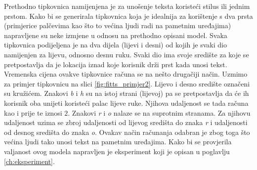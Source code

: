 \documentclass[times, utf8, zavrsni, numeric]{fer}
\begin{document}
Prethodno tipkovnica namijenjena je za unošenje teksta koristeći stilus ili jednim prstom. Kako bi se generirala tipkovnica koja je idealnija za korištenje s dva prsta (primjerice palčevima kao što to većina ljudi radi na pametnim uređajima) napravljene su neke izmjene u odnosu na prethodno opisani model. Svaka tipkovnica podijeljena je na dva dijela (lijevi i desni) od kojih je svaki dio namijenjen za lijevu, odnosno desnu ruku. Svaki dio ima svoje središte za koje se pretpostavlja da je lokacija iznad koje korisnik drži prst kada unosi tekst. Vremenska cijena ovakve tipkovnice računa se na nešto drugačiji način. Uzmimo za primjer tipkovnicu na slici \ref{fig:fitts_primjer2}. Lijevo i desno središte označeni su kružićem. Znakovi \emph{b} i \emph{h} su na istoj strani (lijevoj) pa se pretpostavlja da će ih korisnik oba unijeti koristeći palac lijeve ruke. Njihova udaljenost se tada računa kao i prije te iznosi $2$. Znakovi \emph{r} i \emph{o} nalaze se na suprotnim stranama. Za njihovu udaljenost uzima se zbroj udaljenosti od lijevog središta do znaka \emph{r} i udaljenosti od desnog središta do znaka \emph{o}. Ovakav način računanja odabran je zbog toga što većina ljudi tako unosi tekst na pametnim uređajima. Kako bi se provjerila valjanost ovog modela napravljen je eksperiment koji je opisan u poglavlju \ref{ch:eksperiment}.
\end{document}
